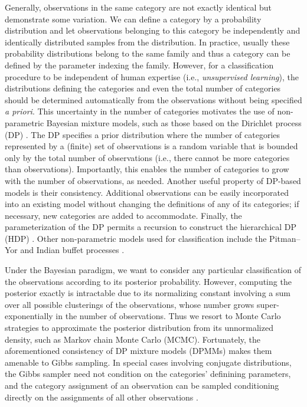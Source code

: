 \documentclass{uwstat572}
\begin{document}
Generally, observations in the same category are not exactly identical but demonstrate some variation.
We can define a category by a probability distribution and let observations belonging to this category be independently and identically distributed samples from the distribution.
In practice, usually these probability distributions belong to the same family and thus a category can be defined by the parameter indexing the family.
However, for a classification procedure to be independent of human expertise (i.e., \emph{unsupervised learning}), the distributions defining the categories and even the total number of categories should be determined automatically from the observations without being specified \textit{a priori}.
This uncertainty in the number of categories motivates the use of non-parametric Bayesian mixture models, such as those based on the Dirichlet process (DP) \citep{Fer73}.
The DP specifies a prior distribution where the number of categories represented by a (finite) set of observations is a random variable that is bounded only by the total number of observations (i.e., there cannot be more categories than observations).
Importantly, this enables the number of categories to grow with the number of observations, as needed.
Another useful property of DP-based models is their consistency.
Additional observations can be easily incorporated into an existing model without changing the definitions of any of its categories; if necessary, new categories are added to accommodate.
Finally, the parameterization of the DP permits a recursion to construct the hierarchical DP (HDP) \citep{TJ10}.
Other non-parametric models used for classification include the Pitman--Yor \citep{PY97} and Indian buffet processes \citep{GG06}.

Under the Bayesian paradigm, we want to consider any particular classification of the observations according to its posterior probability.
However, computing the posterior exactly is intractable due to its normalizing constant involving a sum over all possible clusterings of the observations, whose number grows super-exponentially in the number of observations.
Thus we resort to Monte Carlo strategies to approximate the posterior distribution from its unnormalized density, such as Markov chain Monte Carlo (MCMC).
Fortunately, the aforementioned consistency of DP mixture models (DPMMs) makes them amenable to Gibbs sampling.
In special cases involving conjugate distributions, the Gibbs sampler need not condition on the categories' definining parameters, and the category assignment of an observation can be sampled conditioning directly on the assignments of all other observations \citep{Nea00}.
\end{document}
